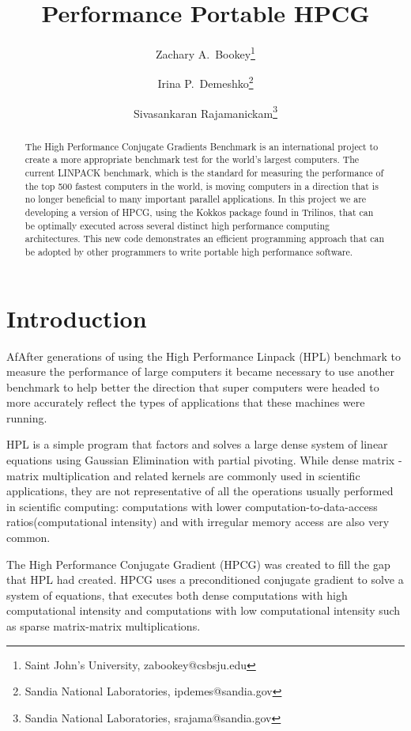 \documentclass{ccr15}
\title{Performance Portable HPCG}
\author{Zachary A.\ Bookey\thanks{Saint John's University, zabookey@csbsju.edu} \and Irina P.\ Demeshko\thanks{Sandia National Laboratories,
ipdemes@sandia.gov} \and Sivasankaran Rajamanickam\thanks{Sandia National Laboratories, srajama@sandia.gov}}
\begin{document}
\maketitle

\begin{abstract}
The High Performance Conjugate Gradients Benchmark is an international project to create a
more appropriate benchmark test for the world's largest computers. The current LINPACK benchmark,
which is the standard for measuring the performance of the top 500 fastest computers in the
world, is moving computers in a direction that is no longer beneficial to many important
parallel applications. In this project we are developing a version of HPCG, using the Kokkos
package found in Trilinos, that can be optimally executed across several distinct high
performance computing architectures. This new code demonstrates an efficient programming 
approach that can be adopted by other programmers to write portable high performance software.
\end{abstract}

\section{Introduction}

AfAfter generations of using the High Performance Linpack (HPL) benchmark to measure the
performance of large computers it became necessary to use another benchmark to help better the
direction that super computers were headed to more accurately reflect the types of applications
that these machines were running.

HPL is a simple program that factors and solves a large dense system of linear equations using
Gaussian Elimination with partial pivoting.
While dense matrix - matrix multiplication and related kernels are commonly used in scientific applications,
they are not representative of all the operations usually performed in scientific computing:
computations with lower computation-to-data-access ratios(computational intensity) and with
irregular memory access are also very common.

The High Performance Conjugate Gradient (HPCG) was created to fill the gap that HPL had created.
HPCG uses a preconditioned conjugate gradient to solve a system of equations, that executes both
dense computations with high computational intensity and computations with low computational intensity such as sparse matrix-matrix multiplications.
\end{document}
